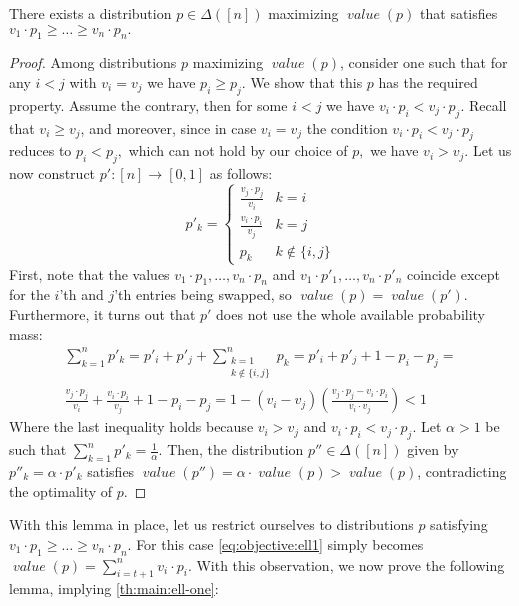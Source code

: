\documentclass[sigconf,nonacm]{aamas}
\DeclareMathOperator{\valueText}{\textit{value}}
\newcommand{\val}[1]{\valueText({#1})}
\begin{document}
\begin{lemma}\label{lemma:increasing:ell1} There exists a distribution $p \in \Delta([n])$ maximizing $\val{p}$ that satisfies $v_1 \cdot p_1 \geq \dots \geq v_n \cdot p_n.$
\end{lemma}
\begin{proof} Among distributions $p$ maximizing $\val{p}$, consider one such that for any $i < j$ with $v_i = v_j$ we have $p_i \geq p_j$. We show that this $p$ has the required property. Assume the contrary, then for some $i < j$ we have $v_i \cdot p_i < v_j \cdot p_j$. Recall that $v_i \geq v_j$, and moreover, since in case $v_i = v_j$ the condition $v_i \cdot p_i < v_j \cdot p_j$ reduces to $p_i < p_j,$ which can not hold by our choice of $p,$ we have $v_i > v_j.$ Let us now construct $p' : [n] \to [0, 1]$ as follows:
\begin{equation*}
    p'_k = \left\{
\begin{array}{ll}
      \frac{v_j \cdot p_j}{v_i} & k = i \\
      \frac{v_i \cdot p_i}{v_j} & k = j \\
      p_k                  & k \notin \{i, j\}
\end{array} 
\right.
\end{equation*}
First, note that the values $v_1\cdot p_1, \dots, v_n \cdot p_n$ and $v_1\cdot p'_1, \dots, v_n \cdot p'_n$ coincide except for the $i$'th and $j$'th entries being swapped, so $\val{p} = \val{p'}$.
Furthermore, it turns out that $p'$ does not use the whole available probability mass:
%
\begin{gather*}
    \sum_{k = 1}^{n}p'_k = p'_i + p'_j + \sum_{\substack{k = 1\\ k \notin\{i, j\}}}^{n}p_k = p'_i + p'_j + 1 - p_i - p_j = \\
    \frac{v_j \cdot p_j}{v_i} + \frac{v_i \cdot p_i}{v_j} + 1 - p_i - p_j = 
    1 - (v_i - v_j)\left(\frac{v_j \cdot p_j - v_i \cdot p_i}{v_i \cdot v_j}\right) < 1
\end{gather*}
Where the last inequality holds because $v_i > v_j$ and $v_i \cdot p_i < v_j \cdot p_j$. Let $\alpha > 1$ be such that $\sum_{k = 1}^{n}p'_k = \frac{1}{\alpha}.$ Then, the distribution $p'' \in \Delta([n])$ given by $p''_k = \alpha \cdot p'_k$ satisfies $\val{p''} = \alpha \cdot \val{p} > \val{p}$, contradicting the optimality of $p$.
\end{proof}

With this lemma in place, let us restrict ourselves to distributions $p$ satisfying $v_1 \cdot p_1 \geq \dots \geq v_n \cdot p_n.$ For this case \cref{eq:objective:ell1} simply becomes $\val{p} = \sum_{i = t + 1}^{n} v_i \cdot p_i.$ With this observation, we now prove the following lemma, implying \cref{th:main:ell-one}:
\end{document}
